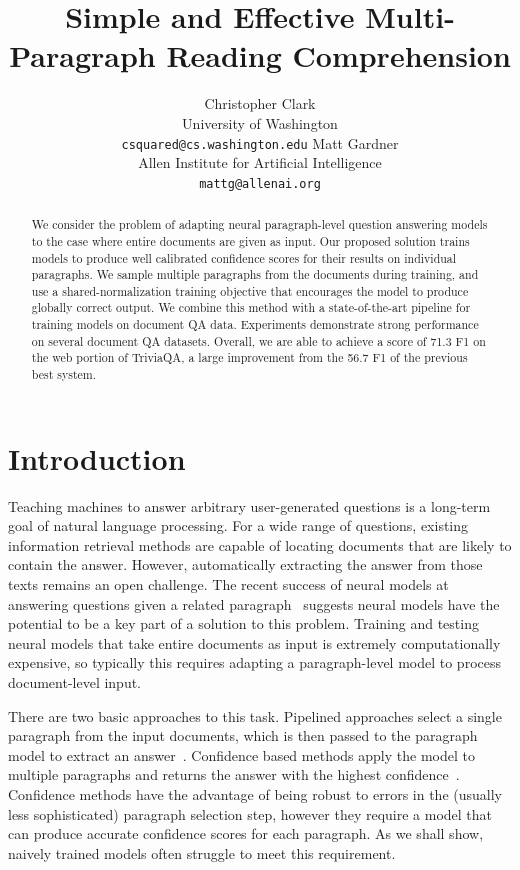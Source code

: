 \documentclass[11pt,a4paper]{article}
\title{Simple and Effective Multi-Paragraph Reading Comprehension}
\author{
Christopher Clark\Thanks{Work completed while interning at the Allen Institute for Artificial Intelligence} \\
University of Washington \\
\texttt{csquared@cs.washington.edu}
\And 
Matt Gardner \\
Allen Institute for Artificial Intelligence \\
\texttt{mattg@allenai.org}
}
\begin{document}
\maketitle

\begin{abstract}
We consider the problem of adapting neural paragraph-level question answering models to the case where entire documents are given as input.
Our proposed solution trains models to produce well calibrated confidence scores for their results on individual paragraphs.
We sample multiple paragraphs from the documents during training, and use a shared-normalization training objective that encourages the model to produce globally correct output. 
We combine this method with a state-of-the-art pipeline for training models on document QA data.
Experiments demonstrate strong performance on several document QA datasets. Overall, we are able to achieve a score of 71.3 F1 on the web portion of TriviaQA, a large improvement from the 56.7 F1 of the previous best system.
\end{abstract}

\section{Introduction}
Teaching machines to answer arbitrary user-generated questions is a long-term goal of natural language processing. For a wide range of questions, existing information retrieval methods are capable of locating documents that are likely to contain the answer. However, automatically extracting the answer from those texts remains an open challenge. The recent success of neural models at answering questions given a related paragraph~\cite{wang2017gated, tan2017s} suggests neural models have the potential to be a key part of a solution to this problem. Training and testing neural models that take entire documents as input is extremely computationally expensive, so typically this requires adapting a paragraph-level model to process document-level input.

There are two basic approaches to this task. Pipelined approaches select a single paragraph from the input documents, which is then passed to the paragraph model to extract an answer~\cite{triviaqa,wang2017r}. Confidence based methods apply the model to multiple paragraphs and returns the answer with the highest confidence~\cite{openqa}. Confidence methods have the advantage of being robust to errors in the (usually less sophisticated) paragraph selection step, however they require a model that can produce accurate confidence scores for each paragraph. As we shall show, naively trained models often struggle to meet this requirement.
\end{document}
